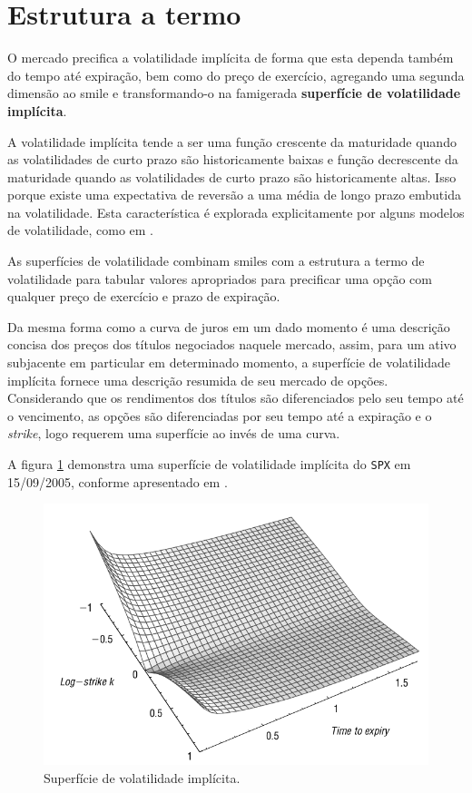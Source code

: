 \documentclass[]{book}
\begin{document}
\section{Estrutura a termo}\label{estrutura-a-termo}

O mercado precifica a volatilidade implícita de forma que esta dependa
também do tempo até expiração, bem como do preço de exercício, agregando
uma segunda dimensão ao smile e transformando-o na famigerada
\textbf{superfície de volatilidade implícita}.

A volatilidade implícita tende a ser uma função crescente da maturidade
quando as volatilidades de curto prazo são historicamente baixas e
função decrescente da maturidade quando as volatilidades de curto prazo
são historicamente altas. Isso porque existe uma expectativa de reversão
a uma média de longo prazo embutida na volatilidade. Esta característica
é explorada explicitamente por alguns modelos de volatilidade, como em
\citet{Heston1993}.

As superfícies de volatilidade combinam smiles com a estrutura a termo
de volatilidade para tabular valores apropriados para precificar uma
opção com qualquer preço de exercício e prazo de expiração.

Da mesma forma como a curva de juros em um dado momento é uma descrição
concisa dos preços dos títulos negociados naquele mercado, assim, para
um ativo subjacente em particular em determinado momento, a superfície
de volatilidade implícita fornece uma descrição resumida de seu mercado
de opções. Considerando que os rendimentos dos títulos são diferenciados
pelo seu tempo até o vencimento, as opções são diferenciadas por seu
tempo até a expiração e o \emph{strike}, logo requerem uma superfície ao
invés de uma curva.

A figura \ref{fig:superficie} demonstra uma superfície de volatilidade
implícita do \texttt{SPX} em 15/09/2005, conforme apresentado em
\citet{Gatheral2011}.

\begin{figure}
\centering
\includegraphics{./images/spx_vol_surface.png}
\caption{\label{fig:superficie}Superfície de volatilidade implícita.}
\end{figure}
\end{document}
